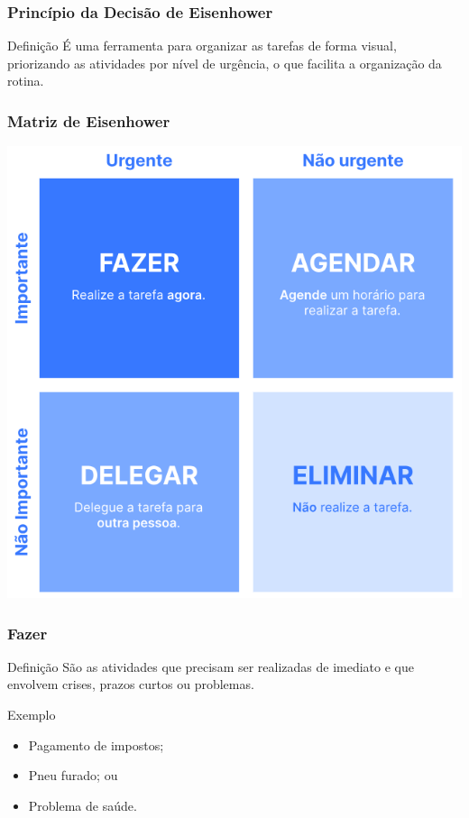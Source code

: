 \documentclass[aspectratio=169]{beamer}
\begin{document}
\begin{frame}
	\frametitle{Princípio da Decisão de Eisenhower}

	\begin{block}{Defini\c cão}
		 É uma ferramenta para organizar as tarefas de forma visual, priorizando as atividades por nível de urgência, o que facilita a organização da rotina.
	\end{block}
\end{frame}

\begin{frame}
	\frametitle{Matriz de Eisenhower}
	
	\begin{center}
		\includegraphics[scale=0.3]{img/matriz_eisenhower}
	\end{center}
\end{frame}

\begin{frame}
	\frametitle{Fazer}

	\begin{block}{Defini\c cão}
		 São as atividades que precisam ser realizadas de imediato e que envolvem crises, prazos curtos ou problemas.
	\end{block}\vfill

	\begin{exampleblock}{Exemplo}
		\begin{itemize}
		 	\item Pagamento de impostos;
			\item Pneu furado; ou
			\item Problema de saúde.
		\end{itemize}
	\end{exampleblock}
\end{frame}
\end{document}
